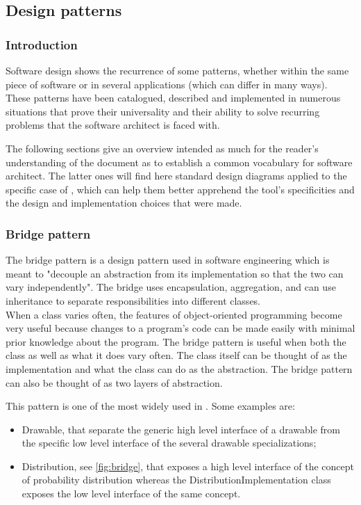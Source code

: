 \subsection{Design patterns}

\subsubsection{Introduction}

Software design shows the recurrence of some patterns, whether within the same piece of software or in several applications (which can differ in many ways). These patterns have been catalogued, described and implemented in numerous situations that prove their universality and their ability to solve recurring problems that the software architect is faced with.

The following sections give an overview intended as much for the reader's understanding of the document as to establish a common vocabulary for software architect. The latter ones will find here standard design diagrams applied to the specific case of \OT, which can help them better apprehend the tool's specificities and the design and implementation choices that were made.

\label{bridge}\subsubsection{Bridge pattern}

The bridge pattern is a design pattern used in software engineering which is meant to "decouple an abstraction from its implementation so that the two can vary independently". The bridge uses encapsulation, aggregation, and can use inheritance to separate responsibilities into different classes.\\
When a class varies often, the features of object-oriented programming become very useful because changes to a program's code can be made easily with minimal prior knowledge about the program. The bridge pattern is useful when both the class as well as what it does vary often. The class itself can be thought of as the implementation and what the class can do as the abstraction. The bridge pattern can also be thought of as two layers of abstraction.

This pattern is one of the most widely used in \OT. Some examples are:
\begin{itemize}
\item Drawable, that separate the generic high level interface of a drawable from the specific low level interface of the several drawable specializations;
\item Distribution, see \ref{fig:bridge}, that exposes a high level interface of the concept of probability distribution whereas the DistributionImplementation class exposes the low level interface of the same concept.
\end{itemize}

